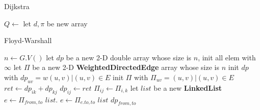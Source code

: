 \documentclass[UTF8,a4paper]{ctexart}
\begin{document}
\begin{algorithm}
    \caption{Dijkstra}\label{algodijkstra}
    \begin{algorithmic}[1] %
        \State {}
        \State $Q\gets$
        \State {}
        \State {}
        \EndFor
        \EndWhile
        \EndFunction
        \State
        \State let $d,\pi$ be new array
        \EndFor
        \EndFunction
        \State
        \State {}
        \Else
        \State {}
        \EndIf
        \EndIf
        \EndFunction
    \end{algorithmic}
\end{algorithm}



\begin{algorithm}[htbp]
    \caption{Floyd-Warshall}\label{algofloyd}
    \begin{algorithmic}[1] %
        \State $n\gets G.V()$
        \State let $dp$ be a new 2-D double array whose size is $n$, init all elem with $\infty$
        \State let $\Pi$ be a new 2-D \textbf{WeightedDirectedEdge} array whose size is $n$
        \State init $dp$ with $dp_{uv} = w(u,v)|(u,v)\in E$
        \State init $\Pi$ with $\Pi_{uv} = (u,v)|(u,v)\in E$
        \State $ret\gets dp_{ik}+dp_{kj}$
        \State $dp_{ij}\gets ret$
        \State $\Pi_{ij}\gets \Pi_{i,k}$
        \EndIf
        \EndFor
        \EndFor
        \EndFor
        \EndFunction
        \State
        \State let $list$ be a new \textbf{LinkedList}
        \State $e\gets \Pi_{from,to}$
        \State $list.$
        \State $e\gets \Pi_{e.to,to}$
        \EndWhile
        \State \Return $list$
        \EndIf
        \State {}
        \EndFunction
        \State
        \State \Return $dp_{from,to}$
        \EndFunction
    \end{algorithmic}
\end{algorithm}
\end{document}
